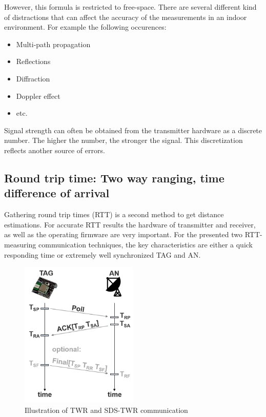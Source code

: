 However, this formula is restricted to free-space. There are several different kind of distractions that can affect the accuracy of the measurements in an indoor environment. For example the following occurences:
\begin{itemize} 
\item Multi-path propagation
\item Reflections
\item Diffraction
\item Doppler effect
\item etc.
\end{itemize}

Signal strength can often be obtained from the transmitter hardware as a discrete number. The higher the number, the stronger the signal. This discretization reflects another source of errors. 

\subsection{Round trip time: Two way ranging, time difference of arrival}
Gathering round trip times (RTT) is a second method to get distance estimations. For accurate RTT results the hardware of transmitter and receiver, as well as the operating firmware are very important. For the presented two RTT-measuring communication techniques, the key characteristics are either a quick responding time or extremely well synchronized TAG and AN.

\begin{figure}[th]
\centering
\includegraphics[width=0.5\textwidth]{Figures/two_way_ranging}
\decoRule
\caption[Two Way Ranging]{Illustration of TWR and SDS-TWR communication}
\label{fig:two_way_ranging}
\end{figure}

